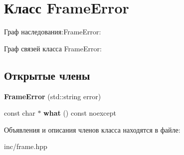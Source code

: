 \hypertarget{classFrameError}{}\section{Класс Frame\+Error}
\label{classFrameError}


Граф наследования\+:Frame\+Error\+:


Граф связей класса Frame\+Error\+:
\subsection*{Открытые члены}
\begin{DoxyCompactItemize}
\item 
\mbox{\label{classFrameError_a8033b71a1ad9d093cf0a38a3bae1b252}} 
{\bfseries Frame\+Error} (std\+::string error)
\item 
\mbox{\label{classFrameError_a5efec381d1272a7f7ffba42cab136805}} 
const char $\ast$ {\bfseries what} () const noexcept
\end{DoxyCompactItemize}


Объявления и описания членов класса находятся в файле\+:\begin{DoxyCompactItemize}
\item 
inc/frame.\+hpp\end{DoxyCompactItemize}
